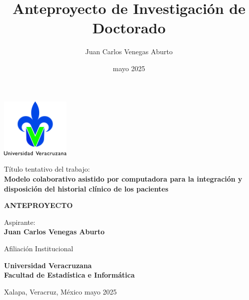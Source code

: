 \documentclass[12pt, letterpaper]{article}
\title{Anteproyecto de Investigación de Doctorado}
\author{Juan Carlos Venegas Aburto}
\date{mayo 2025}
\begin{document}
\begin{center}
    \thispagestyle{empty}
    \includegraphics [width=0.25\textwidth] {images/logoUV}

    \vspace{1.5cm}

    \LARGE{Título tentativo del trabajo:}\\
    \LARGE{\textbf{Modelo colaborativo asistido por computadora para la integración y disposición del historial clínico de los pacientes}}

    \vspace{2cm}
    
    \LARGE{\textbf{ANTEPROYECTO}}
    
    \vspace{2cm}

    \Large{Aspirante:}\\
    \LARGE{\textbf{Juan Carlos Venegas Aburto}}

    \vspace{2cm}

    \Large{Afiliación Institucional}


    \LARGE{\textbf{Universidad Veracruzana}}\\
    \LARGE{\textbf{Facultad de Estadística e Informática}}
        
\end{center}

\vspace{4cm}

\Large Xalapa, Veracruz, México \hfill \Large mayo 2025

\newpage
\thispagestyle{empty}

\renewcommand{\contentsname}{Ìndice}
\tableofcontents

\newpage
\setcounter{page}{1}





\end{document}
